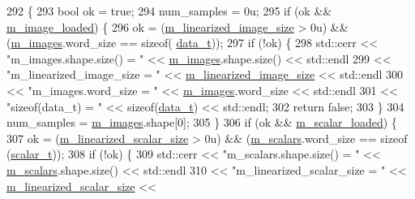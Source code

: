 \begin{DoxyCode}
292                                                           \{
293   \textcolor{keywordtype}{bool} ok = \textcolor{keyword}{true};
294   num\_samples = 0u;
295   \textcolor{keywordflow}{if} (ok && \hyperlink{classlbann_1_1data__reader__jag_a3f1691818996f73dc918dfd0e8f98a70}{m\_image\_loaded}) \{
296     ok = (\hyperlink{classlbann_1_1data__reader__jag_a7c2aa5f489e7c7a3236c1f6c4a760048}{m\_linearized\_image\_size} > 0u) && (\hyperlink{classlbann_1_1data__reader__jag_ae96696fb14653ef1b57936943eb6a800}{m\_images}.word\_size == \textcolor{keyword}{sizeof}(
      \hyperlink{classlbann_1_1data__reader__jag_a7377d6c02c455f019a378489b9b8eab4}{data\_t}));
297     \textcolor{keywordflow}{if} (!ok) \{
298       std::cerr << \textcolor{stringliteral}{"m\_images.shape.size() = "} << \hyperlink{classlbann_1_1data__reader__jag_ae96696fb14653ef1b57936943eb6a800}{m\_images}.shape.size() << std::endl
299                 << \textcolor{stringliteral}{"m\_linearized\_image\_size = "} << \hyperlink{classlbann_1_1data__reader__jag_a7c2aa5f489e7c7a3236c1f6c4a760048}{m\_linearized\_image\_size} << 
      std::endl
300                 << \textcolor{stringliteral}{"m\_images.word\_size = "} << \hyperlink{classlbann_1_1data__reader__jag_ae96696fb14653ef1b57936943eb6a800}{m\_images}.word\_size << std::endl
301                 << \textcolor{stringliteral}{"sizeof(data\_t) = "} << \textcolor{keyword}{sizeof}(\hyperlink{classlbann_1_1data__reader__jag_a7377d6c02c455f019a378489b9b8eab4}{data\_t}) << std::endl;
302       \textcolor{keywordflow}{return} \textcolor{keyword}{false};
303     \}
304     num\_samples = \hyperlink{classlbann_1_1data__reader__jag_ae96696fb14653ef1b57936943eb6a800}{m\_images}.shape[0];
305   \}
306   \textcolor{keywordflow}{if} (ok && \hyperlink{classlbann_1_1data__reader__jag_add9f037609b73da931a4a8a460798db9}{m\_scalar\_loaded}) \{
307     ok = (\hyperlink{classlbann_1_1data__reader__jag_a856b4b9cdf9d8569e5fef1d5d996870d}{m\_linearized\_scalar\_size} > 0u) && (\hyperlink{classlbann_1_1data__reader__jag_ab0ce0a57903e79f029e91356db8b5441}{m\_scalars}.word\_size == \textcolor{keyword}{sizeof}
      (\hyperlink{classlbann_1_1data__reader__jag_aa2e01bc071588b9c1a583e5a752abcc6}{scalar\_t}));
308     \textcolor{keywordflow}{if} (!ok) \{
309       std::cerr << \textcolor{stringliteral}{"m\_scalars.shape.size() = "} << \hyperlink{classlbann_1_1data__reader__jag_ab0ce0a57903e79f029e91356db8b5441}{m\_scalars}.shape.size() << std::endl
310                 << \textcolor{stringliteral}{"m\_linearized\_scalar\_size = "} << \hyperlink{classlbann_1_1data__reader__jag_a856b4b9cdf9d8569e5fef1d5d996870d}{m\_linearized\_scalar\_size} << 

\end{DoxyCode}
